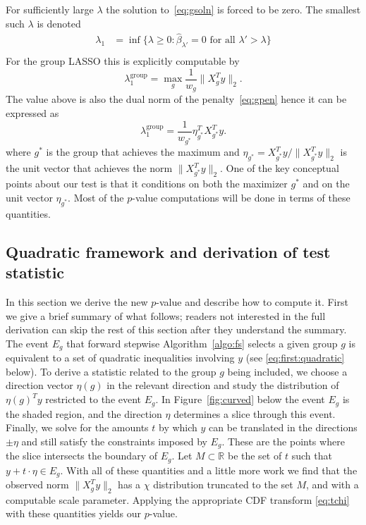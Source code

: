 \documentclass{imsart}
\begin{document}
For sufficiently large $\lambda$ the solution to~\eqref{eq:gsoln} is forced
to be zero. The smallest such $\lambda$ is denoted
\begin{equation}
  \begin{aligned}
   \lambda_1 &= \inf \{ \lambda \geq 0 : \hat \beta_{\lambda'} = 0 \text{ for all } \lambda' > \lambda \} \\
  \end{aligned}
\end{equation}
For the group LASSO this is explicitly computable by
\begin{equation}
\lambda_1^{\text{group}} = \max_{g} \frac{1}{w_g}\|X_g^Ty\|_2 . 
\end{equation}
The value above is also the dual norm of the penalty~\eqref{eq:gpen}
hence it can be expressed as
\begin{equation}
\label{eq:lammax}
\lambda_1^{\text{group}}
 = \frac{1}{w_{g^*}}\eta_{g^*}^TX_{g^*}^Ty . 
\end{equation}
where $g^*$ is the group that achieves the maximum and 
$\eta_{g^*} = X_{g^*}^Ty / \|X_{g^*}^Ty\|_2$ is the unit vector that achieves the norm $\|X_{g^*}^Ty\|_2$. One of the key conceptual points about our
test is that it conditions on both the maximizer $g^*$ and on the unit
vector $\eta_{g^*}$. Most of the $p$-value computations will be done in
terms of these quantities.

\subsection{Quadratic framework and derivation of test statistic}

In this section we derive the new $p$-value and describe how to compute it.
First we give a brief summary of what follows; readers not interested in the full derivation can skip the rest of this section after they understand the summary. The event $E_g$ that forward stepwise Algorithm~\ref{algo:fs} selects a given group $g$ is equivalent to a set of quadratic inequalities involving $y$ (see \eqref{eq:first:quadratic} below). To derive a statistic related to the group $g$ being included, we choose a direction vector $\eta(g)$ in the relevant direction and study the distribution of $\eta(g)^Ty$ restricted to the event $E_g$. In Figure~\ref{fig:curved} below the event $E_g$ is the shaded region, and the direction $\eta$ determines a slice through this event. Finally, we solve for the amounts $t$ by which $y$ can be translated in the directions $\pm \eta$ and still satisfy the constraints imposed by $E_g$. These are the points where the slice intersects the boundary of $E_g$. Let $M \subset \mathbb R$ be the set of $t$ such that $y + t\cdot\eta \in E_g$. With all of these quantities and a little more work we find that the observed norm $\| X_g^Ty \|_2$ has a $\chi$ distribution truncated to the set $M$, and with a computable scale parameter. Applying the appropriate CDF transform \eqref{eq:tchi} with these quantities yields our $p$-value.
\end{document}
